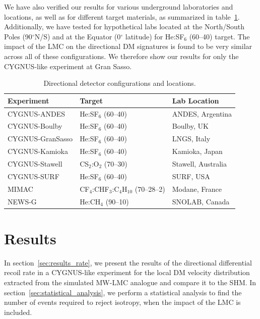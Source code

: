 \documentclass[a4paper,11pt]{article}
\begin{document}
We have also verified our results for various underground laboratories and locations, as well as for different target materials, as summarized in table~\ref{tab:other_exp}. Additionally, we have tested for hypothetical labs located at the North/South Poles (90$^\circ$N/S) and at the Equator (0$^\circ$ latitude) for He:SF$_6$ (60–40) target. The impact of the LMC on the directional DM signatures is found to be very similar across all of these configurations. We therefore show our results for only  the CYGNUS-like experiment at Gran Sasso.

\begin{table}[htbp]
\centering
\begin{tabular}{lll}
\hline
\textbf{Experiment} & \textbf{Target} & \textbf{Lab Location}\\
\hline
CYGNUS-ANDES & He:SF$_6$ (60–40) & ANDES, Argentina \\ 
CYGNUS-Boulby & He:SF$_6$ (60–40) & Boulby, UK \\
CYGNUS-GranSasso & He:SF$_6$ (60–40) & LNGS, Italy \\
CYGNUS-Kamioka & He:SF$_6$ (60–40) & Kamioka, Japan \\
CYGNUS-Stawell & CS$_2$:O$_2$ (70–30) & Stawell, Australia \\
CYGNUS-SURF & He:SF$_6$ (60–40) & SURF, USA \\
MIMAC & CF$_4$:CHF$_3$:C$_4$H$_{10}$ (70–28–2) & Modane, France \\
NEWS-G & He:CH$_4$ (90–10) & SNOLAB, Canada\\
\hline
\end{tabular}
\caption{Directional detector configurations and locations.}
\label{tab:other_exp}
\end{table}


\section{Results}
\label{sec:results}

In  section~\ref{sec:results_rate}, we present the results of the directional differential recoil rate in a CYGNUS-like experiment for the local DM velocity distribution extracted from the simulated MW-LMC analogue and compare it to the SHM. In section~\ref{sec:statistical_analysis}, we perform a statistical analysis to find the number of events required to reject isotropy, when the impact of the LMC is included.
\end{document}
